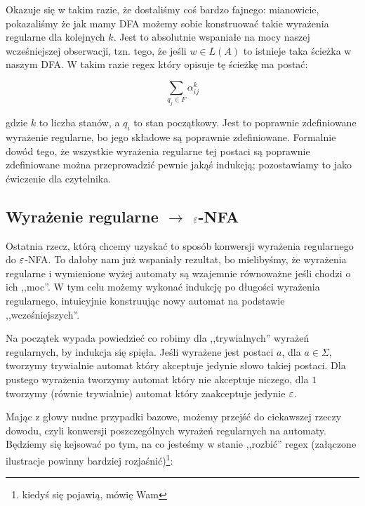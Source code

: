 Okazuje się w takim razie, że dostaliśmy coś bardzo fajnego: mianowicie, pokazaliśmy że jak mamy DFA możemy sobie konstruować takie wyrażenia regularne dla kolejnych \(k\). Jest to absolutnie wspaniałe na mocy naszej wcześniejszej obserwacji, tzn. tego, że jeśli \(w \in L(A) \) to istnieje taka ścieżka w naszym DFA. W takim razie regex który opisuje tę ścieżkę ma postać:

\[
	\sum_{q_j \in F} \alpha^{k}_{ij}
\]

gdzie \(k\) to liczba stanów, a \(q_i\) to stan początkowy. Jest to poprawnie zdefiniowane wyrażenie regularne, bo jego składowe są poprawnie zdefiniowane. Formalnie dowód tego, że wszystkie wyrażenia regularne tej postaci są poprawnie zdefiniowane można przeprowadzić pewnie jakąś indukcją; pozostawiamy to jako ćwiczenie dla czytelnika.

\subsection{Wyrażenie regularne \texorpdfstring{\( \rightarrow \)}{na} \texorpdfstring{\(\varepsilon\)}{epsilon}-NFA}

Ostatnia rzecz, którą chcemy uzyskać to sposób konwersji wyrażenia regularnego do \(\varepsilon\)-NFA. To dałoby nam już wspaniały rezultat, bo mielibyśmy, że wyrażenia regularne i wymienione wyżej automaty są wzajemnie równoważne jeśli chodzi o ich ,,moc''. W tym celu możemy wykonać indukcję po długości wyrażenia regularnego, intuicyjnie konstruując nowy automat na podstawie ,,wcześniejszych''.

Na początek wypada powiedzieć co robimy dla ,,trywialnych'' wyrażeń regularnych, by indukcja się spięła. Jeśli wyrażene jest postaci \(a\), dla \( a \in \Sigma\), tworzymy trywialnie automat który akceptuje jedynie słowo takiej postaci. Dla pustego wyrażenia tworzymy automat który nie akceptuje niczego, dla \(1\) tworzymy (równie trywialnie) automat który zaakceptuje jedynie \(\varepsilon\).

Mając z głowy nudne przypadki bazowe, możemy przejść do ciekawszej rzeczy dowodu, czyli konwersji poszczególnych wyrażeń regularnych na automaty. Będziemy się kejsować po tym, na co jesteśmy w stanie ,,rozbić'' regex (załączone ilustracje powinny bardziej rozjaśnić)\footnote{kiedyś się pojawią, mówię Wam}:

